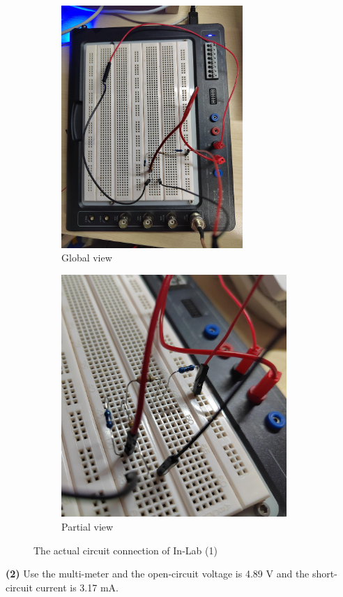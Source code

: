 \documentclass[UTF8]{report}
\theoremstyle{MyLineTheoremStyle} %
\theoremstyle{MyBlockTheoremStyle} %
\theoremstyle{MySubsubsectionStyle} %
\begin{document}
\begin{figure}[H]\centering
\begin{subfigure}[b]{0.45\columnwidth}\centering
    \includegraphics[height=260pt]{assets/Lab1/IMG_20241017_164811.jpg}
    \caption{Global view}
\end{subfigure}\hfill
\begin{subfigure}[b]{0.55\columnwidth}\centering
    \includegraphics[height=260pt]{assets/Lab1/IMG_20241017_164900.jpg}
    \caption{Partial view}
\end{subfigure}
\caption{The actual circuit connection of In-Lab (1)}
\label{The actual circuit connection of In-Lab (1)}
\end{figure}

\noindent \textbf{(2) }
Use the multi-meter and the open-circuit voltage is 4.89 V and the short-circuit current is 3.17 mA.
\end{document}
